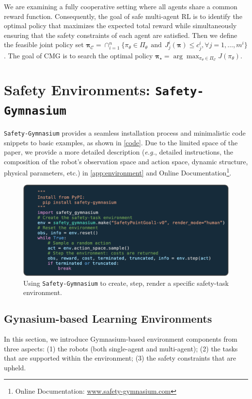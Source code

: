 \documentclass{article}
\begin{document}
We are examining a fully cooperative setting where all agents share a common reward function. Consequently, the goal of safe multi-agent RL is to identify the optimal policy that maximizes the expected total reward while simultaneously ensuring that the safety constraints of each agent are satisfied. Then we define the feasible joint policy set $\bm{\pi}_{\mathcal{C}} = \cap_{i=1}^n \{ \pi_\theta \in \Pi_\theta ~~\mathrm{and}~~ J_j^i(\boldsymbol{\pi}) \leq c_j^i, \forall j=1, \ldots, m^i \}$. The goal of CMG is to search the optimal policy $\bm{\pi}_\star = \arg \max_{\pi_\theta \in \Pi_{\mathcal{C}}} J(\pi_\theta)$.





\section{Safety Environments: \texttt{Safety-Gymnasium}}
\label{sec:env}
\texttt{Safety-Gymnasium} provides a seamless installation process and minimalistic code snippets to basic examples, as shown in \autoref{code}. Due to the limited space of the paper, we provide a more detailed description (\textit{e.g.}, detailed instructions, the composition of the robot's observation space and action space, dynamic structure, physical parameters, etc.) in \autoref{app:environment} and Online Documentation\footnote{Online Documentation: \url{www.safety-gymnasium.com}}.

\begin{figure}[ht]
  \centering
  \includegraphics[width=0.8\linewidth]{assets/main-paper/env_example.pdf}
  \caption{Using \texttt{Safety-Gymnasium} to create, step, render a specific safety-task environment.}
  \label{code}
\end{figure}

\subsection{Gynasium-based Learning Environments}
In this section, we introduce Gymnasium-based environment components from three aspects: (1) the robots (both single-agent and multi-agent); (2) the tasks that are supported within the environment; (3) the safety constraints that are upheld.
\end{document}
